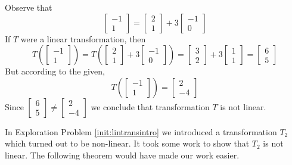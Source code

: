 \documentclass{ximera}
\begin{document}
\begin{example}
\begin{explanation} Observe that
$$\begin{bmatrix}
-1\\
1
\end{bmatrix}=\begin{bmatrix}
2\\
1
\end{bmatrix}+3\begin{bmatrix}
-1\\
0
\end{bmatrix}$$
If $T$ were a linear transformation, then $$T\left(\begin{bmatrix}
-1\\
1
\end{bmatrix}\right)=T\left(\begin{bmatrix}
2\\
1
\end{bmatrix}+3\begin{bmatrix}
-1\\
0
\end{bmatrix}\right)=\begin{bmatrix}
3\\
2
\end{bmatrix}+3\begin{bmatrix}
1\\
1
\end{bmatrix}=\begin{bmatrix}
6\\
5
\end{bmatrix}$$
But according to the given,
$$T\left(\begin{bmatrix}-1\\1\end{bmatrix}\right)=\begin{bmatrix}2\\-4\end{bmatrix}$$
Since $\begin{bmatrix}
6\\
5
\end{bmatrix}\neq \begin{bmatrix}
2\\
-4
\end{bmatrix}$
we conclude that transformation $T$ is not linear.
\end{explanation}
\end{example}
  
  
  
In Exploration Problem \ref{init:lintransintro} we introduced a transformation $T_2$ which turned out to be non-linear.  It took some work to show that $T_2$ is not linear.  The following theorem would have made our work easier.
\end{document}
